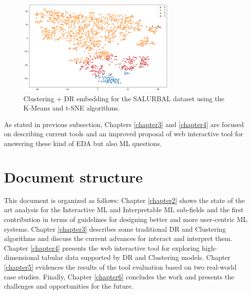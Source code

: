 \begin{figure}[ht]
 \centering
 \includegraphics[width=0.7\textwidth]{salurbal-kmeans-tsne.png}
 \caption{Clustering + DR embedding for the SALURBAL dataset using the K-Means and t-SNE algorithms.}
 \label{fig:salurbal-kmeans-tsne}
\end{figure}

As stated in previous subsection, Chapters \ref{chapter3} and \ref{chapter4} are focused on describing current tools and an improved proposal of web interactive tool for answering these kind of EDA but also ML questions. 

\section{Document structure} %
\label{section1.2}

This document is organized as follows: Chapter \ref{chapter2} shows the state of the art analysis for the Interactive ML and Interpretable ML sub-fields and the first contribution in terms of guidelines for designing better and more user-centric ML systems. Chapter \ref{chapter3} describes some traditional DR and Clustering algorithms and discuss the current advances for interact and interpret them. Chapter \ref{chapter4} presents the web interactive tool for exploring high-dimensional tabular data supported by DR and Clustering models. Chapter \ref{chapter5} evidences the results of the tool evaluation based on two real-world case studies. Finally, Chapter \ref{chapter6} concludes the work and presents the challenges and opportunities for the future.